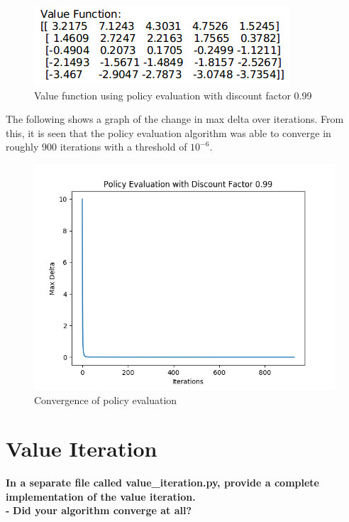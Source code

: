 \documentclass[11pt]{article}
\begin{document}
\begin{figure}[h]
\includegraphics[scale=0.6]{v_evaluation}
\centering
\caption{Value function using policy evaluation with discount factor 0.99}
\end{figure}

\noindent
The following shows a graph of the change in max delta over iterations. From
this, it is seen that the policy evaluation algorithm was able to converge in
roughly 900 iterations with a threshold of $10^{-6}$. \\

\begin{figure}[h]
\includegraphics[scale=0.7]{policy_evaluation_99}
\centering
\caption{Convergence of policy evaluation}
\end{figure}


\newpage
\section{Value Iteration}
\textbf{In a separate file called value\_iteration.py, provide a complete
implementation of the value iteration.}
\\

\noindent
\textbf{-}
\noindent
\textbf{Did your algorithm converge at all?}
\\
\end{document}
